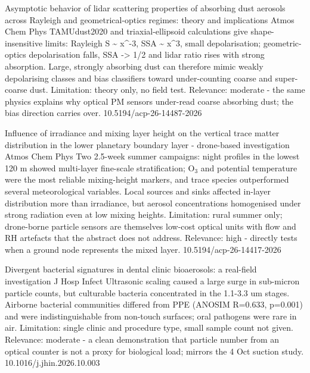 \documentclass[10pt]{article}
\begin{document}
{Asymptotic behavior of lidar scattering properties of absorbing dust aerosols across Rayleigh and geometrical-optics regimes: theory and implications}
{Atmos Chem Phys}
{TAMUdust2020 and triaxial-ellipsoid calculations give shape-insensitive limits: Rayleigh S \textasciitilde{} x\textasciicircum{}-3, SSA \textasciitilde{} x\textasciicircum{}3, small depolarisation; geometric-optics depolarisation falls, SSA -> 1/2 and lidar ratio rises with strong absorption. Large, strongly absorbing dust can therefore mimic weakly depolarising classes and bias classifiers toward under-counting coarse and super-coarse dust. Limitation: theory only, no field test. Relevance: moderate - the same physics explains why optical PM sensors under-read coarse absorbing dust; the bias direction carries over.}
{10.5194/acp-26-14487-2026}

{Influence of irradiance and mixing layer height on the vertical trace matter distribution in the lower planetary boundary layer - drone-based investigation}
{Atmos Chem Phys}
{Two 2.5-week summer campaigns: night profiles in the lowest 120 m showed multi-layer fine-scale stratification; O$_3$ and potential temperature were the most reliable mixing-height markers, and trace species outperformed several meteorological variables. Local sources and sinks affected in-layer distribution more than irradiance, but aerosol concentrations homogenised under strong radiation even at low mixing heights. Limitation: rural summer only; drone-borne particle sensors are themselves low-cost optical units with flow and RH artefacts that the abstract does not address. Relevance: high - directly tests when a ground node represents the mixed layer.}
{10.5194/acp-26-14417-2026}

\par{}\baselineskip{}\baselineskip
{}

{Divergent bacterial signatures in dental clinic bioaerosols: a real-field investigation}
{J Hosp Infect}
{Ultrasonic scaling caused a large surge in sub-micron particle counts, but culturable bacteria concentrated in the 1.1-3.3 um stages. Airborne bacterial communities differed from PPE (ANOSIM R=0.633, p=0.001) and were indistinguishable from non-touch surfaces; oral pathogens were rare in air. Limitation: single clinic and procedure type, small sample count not given. Relevance: moderate - a clean demonstration that particle number from an optical counter is not a proxy for biological load; mirrors the 4 Oct suction study.}
{10.1016/j.jhin.2026.10.003}
\end{document}
